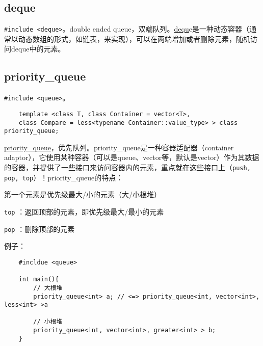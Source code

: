 \subsection{deque}
\texttt{#include <deque>}。double ended queue，双端队列。\href{https://www.cplusplus.com/reference/deque/deque/?kw=deque}{dequ}e是一种动态容器（通常以动态数组的形式，如链表，来实现），可以在两端增加或者删除元素，随机访问deque中的元素。

\subsection{priority\_queue}
\texttt{#include <queue>}。
\begin{verbatim}
	template <class T, class Container = vector<T>,
	class Compare = less<typename Container::value_type> > class priority_queue;
\end{verbatim}
\href{https://www.cplusplus.com/reference/queue/priority_queue/?kw=priority_queue}{priority\_queue}，优先队列。priority\_queue是一种容器适配器（container adaptor），它使用某种容器（可以是queue、vector等，默认是vector）作为其数据的容器，并提供了一些接口来访问容器内的元素，重点就在这些接口上（\texttt{push, pop, top}）！priority\_queue的特点：
\begin{myitemize}
	\item 第一个元素是优先级最大/小的元素（大/小根堆）
	\item \texttt{top} ：返回顶部的元素，即优先级最大/最小的元素
	\item \texttt{pop} ：删除顶部的元素
\end{myitemize}
例子：
\begin{verbatim}
	#incldue <queue>
	
	int main(){
		// 大根堆
		priority_queue<int> a; // <=> priority_queue<int, vector<int>, less<int> >a
		
		// 小根堆
		priority_queue<int, vector<int>, greater<int> > b;
	}
\end{verbatim}


